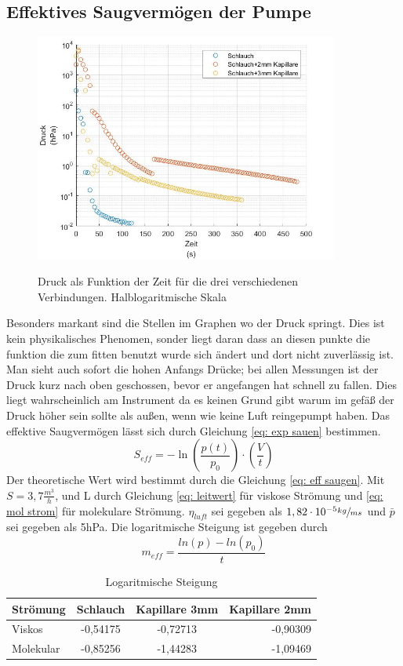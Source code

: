 \documentclass[12pt]{article}
\begin{document}
	\subsection{Effektives Saugvermögen der Pumpe}
	\begin{figure}[H]
		\centering
		\includegraphics[width=10cm]{Druck-Pumpzeit.jpg}
		\label{fig: Zeit-Druck}
		\caption{Druck als Funktion der Zeit für die drei verschiedenen Verbindungen. Halblogaritmische Skala}
	\end{figure}
	Besonders markant sind die Stellen im Graphen wo der Druck springt. Dies ist kein physikalisches Phenomen, sonder liegt daran dass an diesen punkte die funktion die zum fitten benutzt wurde sich ändert und dort nicht zuverlässig ist. 
	Man sieht auch sofort die hohen Anfangs Drücke; bei allen Messungen ist der Druck kurz nach oben geschossen, bevor er angefangen hat schnell zu fallen. Dies liegt wahrscheinlich am Instrument da es keinen Grund gibt warum im gefäß der Druck höher sein sollte als außen, wenn wie keine Luft reingepumpt haben.
	Das effektive Saugvermögen lässt sich durch Gleichung \ref{eq: exp sauen} bestimmen.
	\begin{equation}
		S_{eff}=- \ln \left(\frac{p(t)}{p_0}  \right)\cdot \left( \frac{V}{t}\right)
	\end{equation} 
	Der theoretische Wert wird bestimmt durch die Gleichung \ref{eq: eff saugen}. Mit $S=3,7\frac{m^3}{h}$, und L durch Gleichung \ref{eq: leitwert} für viskose Strömung 
	und \ref{eq: mol strom} für molekulare Strömung. $\eta_{luft}$ sei gegeben als $1,82 \cdot 10^{-5}\sfrac{kg}{ms}$ und $\bar{p}$ sei gegeben als 5hPa.
	Die logaritmische Steigung ist gegeben durch
	\begin{equation}
			m_{eff}=\frac{ln(p)-ln(p_0)}{t}
	\end{equation}
		\begin{table} [H]
		\begin{center}
			\caption{Logaritmische Steigung}
			\begin{tabular}{l|c|c|r}
				\textbf{Strömung } & \textbf{Schlauch}  & \textbf{Kapillare 3mm} & \textbf{Kapillare 2mm}\\
				\hline
					Viskos    &	-0,54175     & -0,72713 & -0,90309\\
					Molekular & 	-0,85256 & -1,44283 & -1,09469\\
			\end{tabular}
		\end{center}
		\end{table}
\end{document}
